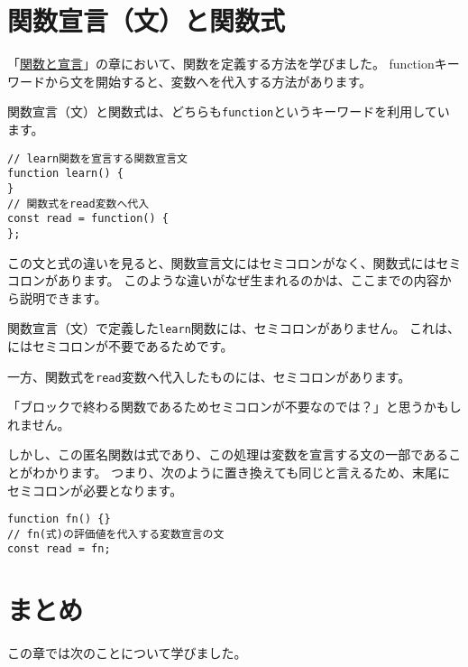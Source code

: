 \hypertarget{function-statement-and-function-expression}{%
\section{関数宣言（文）と関数式}\label{function-statement-and-function-expression}}

「\hyperlink{function-and-declaration}{関数と宣言}」の章において、関数を定義する方法を学びました。
functionキーワードから文を開始する\textbf{}と、変数へ\textbf{}を代入する方法があります。

関数宣言（文）と関数式は、どちらも\texttt{function}というキーワードを利用しています。

\begin{lstlisting}
// learn関数を宣言する関数宣言文
function learn() {
}
// 関数式をread変数へ代入
const read = function() {
};
\end{lstlisting}

この文と式の違いを見ると、関数宣言文にはセミコロンがなく、関数式にはセミコロンがあります。
このような違いがなぜ生まれるのかは、ここまでの内容から説明できます。

関数宣言（文）で定義した\texttt{learn}関数には、セミコロンがありません。
これは、\textbf{}にはセミコロンが不要であるためです。

一方、関数式を\texttt{read}変数へ代入したものには、セミコロンがあります。

「ブロックで終わる関数であるためセミコロンが不要なのでは？」と思うかもしれません。

しかし、この匿名関数は式であり、この処理は変数を宣言する文の一部であることがわかります。
つまり、次のように置き換えても同じと言えるため、末尾にセミコロンが必要となります。\enlargethispage{\baselineskip}\enlargethispage{\baselineskip}

\begin{lstlisting}
function fn() {}
// fn(式)の評価値を代入する変数宣言の文
const read = fn;
\end{lstlisting}

\hypertarget{statement-expression-summary}{%
\section{まとめ}\label{statement-expression-summary}}

この章では次のことについて学びました。

